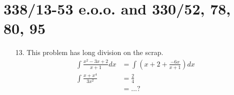 \documentclass[11pt]{article}
\begin{document}
\section{338/13-53 e.o.o. and 330/52, 78, 80, 95}
\begin{itemize}
\item [13. ] This problem has long division on the scrap.
\begin{align*}
	\int \frac{x^2-3x+2}{x+1}dx &= \int \left( x+2+\frac{-6x}{x+1}\right)dx \\
	\int \frac{x+x^4}{3x^2} &= \frac{2}{4}\\
	&= \ldots ?
\end{align*}
\end{itemize}
\end{document}
